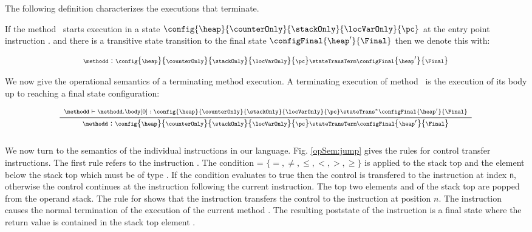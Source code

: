 The following definition characterizes the executions that terminate. 


 \begin{transClosStateTrans1} \label{stateTransClos}
   If  the method \methodd \  starts execution in a state $\config{ \heap}{\counterOnly}{\stackOnly}{\locVarOnly}{\pc}$   
   at the entry point instruction \mbox{\rm\methodd.\body[0]} 
   and there is a transitive state transition to the final state $\configFinal{ \heap'}{\Final}$ then   we denote this  with: 

    $$ {\scriptsize \methodd : \config{ \heap}{\counterOnly}{\stackOnly}{\locVarOnly}{ \pc } \stateTransTerm \configFinal{ \heap'}{\Final} }$$
 \end{transClosStateTrans1}
 



 We now give the operational semantics of a terminating method execution. A terminating execution of method \methodd \
 is the execution of its body up to reaching a final state configuration:
 
 $$
 {\scriptsize  \frac{\begin{array}{l}
          \methodd \vdash  \methodd.\body[0] :  
	                    \config{\heap}{\counterOnly}{\stackOnly}{\locVarOnly}{\pc}  \stateTrans^{*} \configFinal{\heap'}{\Final}\\
	\end{array}	 
       }
       {\methodd :  \config{\heap}{\counterOnly}{\stackOnly}{\locVarOnly}{\pc} 
		    \stateTransTerm
                   \configFinal{\heap'} {\Final} }}$$ \\


 

   

We now turn to the semantics of the individual instructions in our language. 
 Fig. \ref{opSem:jump} gives the rules for control transfer instructions. The first rule refers to
the instruction \ifCond. The condition \rel = $\{ =, \neq, \le, <, >, \ge \} $ is applied to the stack top  \stackOnlyParam{\counterOnly} and the element below the stack top 
\stackOnlyParam{\counterOnly -1} which must be of type \Myint. If the condition evaluates to true then the control is transfered to the instruction
  at index \texttt{n}, otherwise the control continues at the instruction following the current instruction. The top two elements \stackOnlyParam{\counterOnly} and
 \stackOnlyParam{\counterOnly - 1}  of the stack top are popped from the operand stack. The rule for \goto{} shows that the instruction
 transfers the control to the instruction at position $n$.   
 The instruction \return{} causes the normal termination of the execution of the current method \methodd.
 The resulting poststate of the  instruction is a final state where the return value is contained in  
 the stack top element \stackOnlyParam{\counterOnly}.


